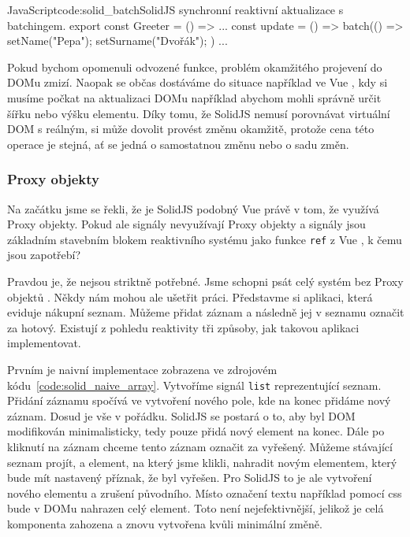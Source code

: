 \documentclass[
  master,
  program=ainf,
  tables=false,
  sourcecodes,
  glossaries,
  index
]{kidiplom}
\begin{document}
  \begin{kicode}{JavaScript}{code:solid_batch}{SolidJS synchronní reaktivní aktualizace s batchingem.}
    export const Greeter = () => {
      ...
      const update = () => batch(() => {
        setName("Pepa");
        setSurname("Dvořák");
        })
        ...
        }
      \end{kicode}

Pokud bychom opomenuli odvozené funkce, problém okamžitého projevení do DOMu zmizí. Naopak se občas
dostáváme do situace například ve Vue \cite{vue}, kdy si musíme počkat na aktualizaci DOMu například abychom mohli
správně určit šířku nebo výšku elementu. Díky tomu, že SolidJS \cite{solidjs} nemusí porovnávat virtuální DOM s reálným,
si může dovolit provést změnu okamžitě, protože cena této operace je stejná, ať se jedná o samostatnou změnu
nebo o sadu změn. 
    
\subsubsection{Proxy objekty}
Na začátku jsme se řekli, že je SolidJS \cite{solidjs} podobný Vue \cite{vue} právě v tom, že využívá Proxy objekty. Pokud ale
signály nevyužívají Proxy objekty \cite{proxy} a signály jsou základním stavebním blokem reaktivního systému jako
funkce {\tt ref} z Vue \cite{vue}, k čemu jsou zapotřebí?

Pravdou je, že nejsou striktně potřebné. Jsme schopni psát celý systém bez Proxy objektů \cite{proxy}.
Někdy nám mohou ale ušetřit práci. Představme si aplikaci, která eviduje nákupní seznam. Můžeme přidat
záznam a následně jej v seznamu označit za hotový. Existují z pohledu reaktivity tři způsoby, jak takovou 
aplikaci implementovat.

Prvním je naivní implementace zobrazena ve zdrojovém kódu~\ref{code:solid_naive_array}. Vytvoříme signál {\tt list}
reprezentující seznam. Přidání záznamu spočívá ve 
vytvoření nového pole, kde na konec přidáme nový záznam. Dosud je vše v pořádku. SolidJS \cite{solidjs} se postará o to,
aby byl DOM modifikován minimalisticky, tedy pouze přidá nový element na konec. Dále po kliknutí na záznam
chceme tento záznam označit za vyřešený. Můžeme stávající seznam projít, a element, na který jsme klikli,
nahradit novým elementem, který bude mít nastavený příznak, že byl vyřešen. Pro SolidJS \cite{solidjs} to je ale vytvoření
nového elementu a zrušení původního. Místo označení textu například pomocí css bude v DOMu nahrazen celý
element. Toto není nejefektivnější, jelikož je celá komponenta zahozena a znovu vytvořena kvůli minimální
změně.
\end{document}
